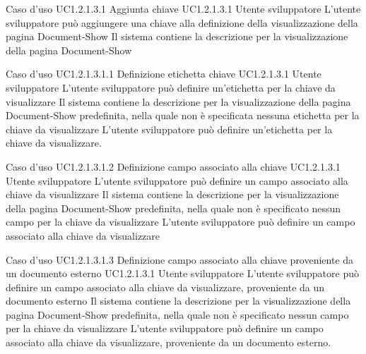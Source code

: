 \UCtitle
{Caso d'uso UC1.2.1.3.1}
{Aggiunta chiave}
\UC
{UC1.2.1.3.1}
{Utente sviluppatore}
{L'utente sviluppatore può aggiungere una chiave alla definizione della visualizzazione della pagina Document-Show}
{Il sistema contiene la descrizione per la visualizzazione della pagina Document-Show}

\UCtitle
{Caso d'uso UC1.2.1.3.1.1}
{Definizione etichetta chiave}
\UC
{UC1.2.1.3.1}
{Utente sviluppatore}
{L'utente sviluppatore può definire un'etichetta per la chiave da visualizzare}
{Il sistema contiene la descrizione per la visualizzazione della pagina Document-Show predefinita, nella quale non è specificata nessuna etichetta per la chiave da visualizzare}
\scenario
{L'utente sviluppatore può definire un'etichetta per la chiave da visualizzare.}

\UCtitle
{Caso d'uso UC1.2.1.3.1.2}
{Definizione campo associato alla chiave}
\UC
{UC1.2.1.3.1}
{Utente sviluppatore}
{L'utente sviluppatore può definire un campo associato alla chiave da visualizzare}
{Il sistema contiene la descrizione per la visualizzazione della pagina Document-Show predefinita, nella quale non è specificato nessun campo per la chiave da visualizzare}
\scenario
{L'utente sviluppatore può definire un campo associato alla chiave da visualizzare}

\UCtitle
{Caso d'uso UC1.2.1.3.1.3}
{Definizione campo associato alla chiave proveniente da un documento esterno}
\UC
{UC1.2.1.3.1}
{Utente sviluppatore}
{L'utente sviluppatore può definire un campo associato alla chiave da visualizzare, proveniente da un documento esterno}
{Il sistema contiene la descrizione per la visualizzazione della pagina Document-Show predefinita, nella quale non è specificato nessun campo per la chiave da visualizzare}
\scenario
{L'utente sviluppatore può definire un campo associato alla chiave da visualizzare, proveniente da un documento esterno.}

